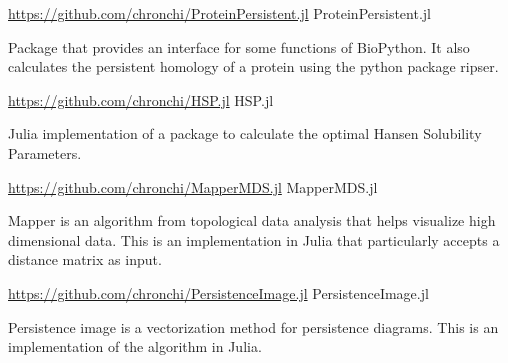 

\begin{cventries}

\cventry
  {\url{https://github.com/chronchi/ProteinPersistent.jl}} %
  {ProteinPersistent.jl} %
  {}{}
  {
    \begin{cvitems} %
      \item {Package that provides an interface for some functions of BioPython.
      It also calculates the persistent homology of a protein using the python
      package ripser.}
    \end{cvitems}
  }

\cventry
  {\url{https://github.com/chronchi/HSP.jl}} %
  {HSP.jl} %
  {}{}
  {
    \begin{cvitems} %
      \item {Julia implementation of a package to calculate the
      optimal Hansen Solubility Parameters.}
    \end{cvitems}
  }

\cventry
  {\url{https://github.com/chronchi/MapperMDS.jl}} %
  {MapperMDS.jl} %
  {}{}
  {
    \begin{cvitems} %
      \item {Mapper is an algorithm from topological data analysis that
      helps visualize high dimensional data. This is
      an implementation in Julia that particularly accepts a distance matrix
      as input.}
    \end{cvitems}
  }

\cventry
  {\url{https://github.com/chronchi/PersistenceImage.jl}} %
  {PersistenceImage.jl} %
  {}{}
  {
    \begin{cvitems} %
      \item {Persistence image is a vectorization method for persistence
      diagrams. This is an implementation of the algorithm in Julia.}
    \end{cvitems}
  }


\end{cventries}
